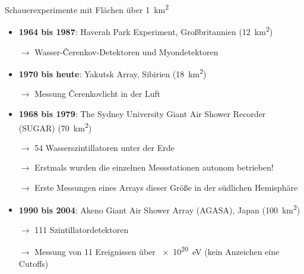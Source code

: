 \documentclass[aspectratio=1610, professionalfonts, 9pt, hyperref={colorlinks=false}]{beamer}
\begin{document}
\begin{frame}{Schauerexperimente mit Flächen über \SI{1}{\kilo\metre\squared}}
      \begin{itemize}
        \setlength\itemsep{0.5em}
        \item \textbf{1964 bis 1987}: Haverah Park Experiment, Großbritannien (\SI{12}{\kilo\metre\squared})
        \item[$\rightarrow$] Wasser-Čerenkov-Detektoren und Myondetektoren
        \item \textbf{1970 bis heute}: Yakutsk Array, Sibirien (\SI{18}{\kilo\metre\squared})
        \item[$\rightarrow$] Messung Čerenkovlicht in der Luft
        \item \textbf{1968 bis 1979}: The Sydney University Giant Air Shower Recorder (SUGAR) (\SI{70}{\kilo\metre\squared})
        \item[$\rightarrow$] 54 Wasserszintillatoren unter der Erde
        \item[$\rightarrow$] Erstmals wurden die einzelnen Messstationen autonom betrieben!
        \item[$\rightarrow$] Erste Messungen eines Arrays dieser Größe in der südlichen Hemisphäre
        \item \textbf{1990 bis 2004}: Akeno Giant Air Shower Array (AGASA), Japan (\SI{100}{\kilo\metre\squared})
        \item[$\rightarrow$] 111 Szintillatordetektoren
        \item[$\rightarrow$] Messung von 11 Ereignissen über \SI{e20}{\electronvolt} (kein Anzeichen eine Cutoffs)


      \end{itemize}
\end{frame}
\end{document}
